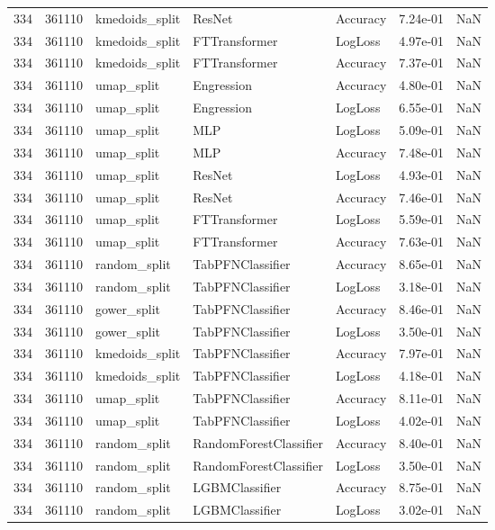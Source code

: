\begin{tabular}{rrlllrr}
334 & 361110 & kmedoids\_split & ResNet & Accuracy & 7.24e-01 & NaN \\
334 & 361110 & kmedoids\_split & FTTransformer & LogLoss & 4.97e-01 & NaN \\
334 & 361110 & kmedoids\_split & FTTransformer & Accuracy & 7.37e-01 & NaN \\
334 & 361110 & umap\_split & Engression & Accuracy & 4.80e-01 & NaN \\
334 & 361110 & umap\_split & Engression & LogLoss & 6.55e-01 & NaN \\
334 & 361110 & umap\_split & MLP & LogLoss & 5.09e-01 & NaN \\
334 & 361110 & umap\_split & MLP & Accuracy & 7.48e-01 & NaN \\
334 & 361110 & umap\_split & ResNet & LogLoss & 4.93e-01 & NaN \\
334 & 361110 & umap\_split & ResNet & Accuracy & 7.46e-01 & NaN \\
334 & 361110 & umap\_split & FTTransformer & LogLoss & 5.59e-01 & NaN \\
334 & 361110 & umap\_split & FTTransformer & Accuracy & 7.63e-01 & NaN \\
334 & 361110 & random\_split & TabPFNClassifier & Accuracy & 8.65e-01 & NaN \\
334 & 361110 & random\_split & TabPFNClassifier & LogLoss & 3.18e-01 & NaN \\
334 & 361110 & gower\_split & TabPFNClassifier & Accuracy & 8.46e-01 & NaN \\
334 & 361110 & gower\_split & TabPFNClassifier & LogLoss & 3.50e-01 & NaN \\
334 & 361110 & kmedoids\_split & TabPFNClassifier & Accuracy & 7.97e-01 & NaN \\
334 & 361110 & kmedoids\_split & TabPFNClassifier & LogLoss & 4.18e-01 & NaN \\
334 & 361110 & umap\_split & TabPFNClassifier & Accuracy & 8.11e-01 & NaN \\
334 & 361110 & umap\_split & TabPFNClassifier & LogLoss & 4.02e-01 & NaN \\
334 & 361110 & random\_split & RandomForestClassifier & Accuracy & 8.40e-01 & NaN \\
334 & 361110 & random\_split & RandomForestClassifier & LogLoss & 3.50e-01 & NaN \\
334 & 361110 & random\_split & LGBMClassifier & Accuracy & 8.75e-01 & NaN \\
334 & 361110 & random\_split & LGBMClassifier & LogLoss & 3.02e-01 & NaN \\

\end{tabular}
